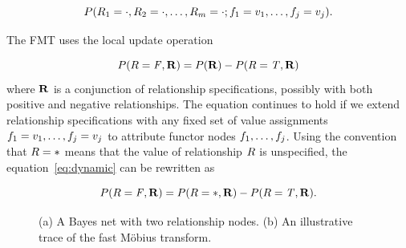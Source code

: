 \documentclass[runningheads,a4paper]{llncs}
\begin{document}
$$P(R_{1} = \cdot, R_{2} = \cdot,\ldots, R_{m} = \cdot; f_{1} = v_{1},\ldots,f_{j} = v_{j}).$$

The FMT uses the local update operation

\begin{equation}
P(R = \mathit{F}, \mathbf{R}) =
P(\mathbf{R}) - P(R = \mathit{T}, \mathbf{R})
\label{eq:dynamic}
\end{equation}
where $\mathbf{R}$ is a conjunction of relationship specifications, possibly with both positive and negative relationships. The equation continues to hold if we extend relationship specifications with  any fixed set of value assignments $f_{1} = v_{1},\ldots,f_{j} = v_{j}$ to attribute functor nodes $f_{1},\ldots,f_{j}$. Using the convention that $R = \ast$ means that the value of relationship $R$ is unspecified, the equation~\eqref{eq:dynamic} can be rewritten as

\begin{equation}
P(R = \mathit{F}, \mathbf{R}) =
P(R=*, \mathbf{R}) - P(R = \mathit{T}, \mathbf{R}).
\label{eq:dynamic2}
\end{equation}

\begin{figure}[tb]
\begin{center}
\caption{(a) A Bayes net with two relationship nodes. (b) An illustrative trace of the fast M\"obius transform. 
\label{fig:example}}
\end{center}
\end{figure}
\end{document}

